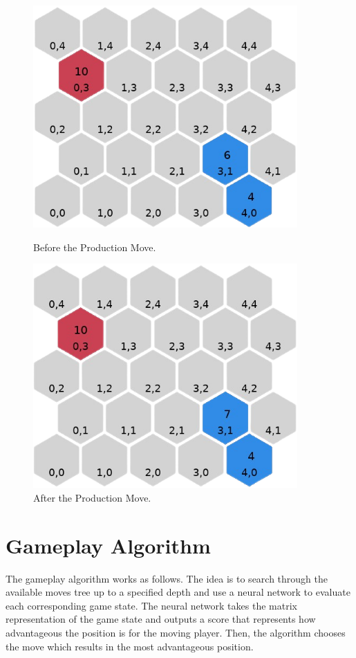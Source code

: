 \documentclass[letterpaper, 12pt]{article}
\begin{document}
\begin{figure}[H]
  \begin{minipage}[c]{.5\textwidth}
    \centering
    \includegraphics[width=0.9\textwidth]{production_example_1.png}
    \caption{Before the Production Move.}
  \end{minipage}%
  \begin{minipage}[c]{.5\textwidth} \centering
    \includegraphics[width=0.9\textwidth]{production_example_2.png}
    \caption{After the Production Move.}
  \end{minipage}
\end{figure}

\section*{Gameplay Algorithm}
The gameplay algorithm works as follows. The idea is to search through the available
moves tree up to a specified depth and use a neural network to evaluate each
corresponding game state. The neural network takes the matrix representation of the game
state and outputs a score that represents how advantageous the position is for the
moving player. Then, the algorithm chooses the move which results in the most
advantageous position.
\end{document}
